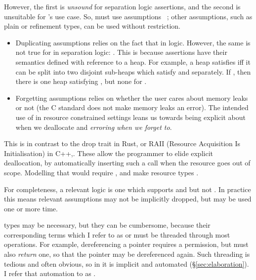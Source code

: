 However, the first is \emph{unsound} for separation logic assertions, and the
second is unsuitable for 's use case. So,  must use  assumptions ~; other
assumptions, such as plain or refinement types, can be used without
restriction.
\begin{itemize}
    \item Duplicating assumptions relies on the fact that
         in  logic. However, the
        same is not true for \sm{\ast} in separation logic:
        . This is because assertions have their
        semantics defined with reference to a heap. For example, a heap
        satisfies  iff it can be split into two disjoint
        sub-heaps which satisfy  and  separately. If , then there is one heap satisfying , but none
        for .
    \item Forgetting assumptions relies on whether the user cares about memory
        leaks or not (the C standard does not make memory leaks an
        error). The intended use of  in resource constrained settings
        leans us towards being explicit about when we deallocate and
        \emph{erroring when we forget to}.
\end{itemize}

This is in contrast to the drop trait in
Rust, or RAII
(Resource Acquisition Is Initialisation) in
C++,.
These allow the programmer to elide explicit deallocation, by automatically
inserting such a call when the resource goes out of scope. Modelling that would
require , and make resource types .

For completeness, a relevant logic is one which supports
 and  but not . In practice this
means relevant assumptions may not be implicitly dropped, but may be used one
or more time.

 types may be necessary, but they can be cumbersome, because their
corresponding terms \textemdash{} which I refer to as  or
 \textemdash{} must be threaded through most operations. For
example, dereferencing a pointer requires a permission, but must also
\emph{return} one, so that the pointer may be dereferenced again. Such
threading is tedious and often obvious, so in  it is implicit and
automated (\S\ref{sec:elaboration}). I refer that automation to as
.

